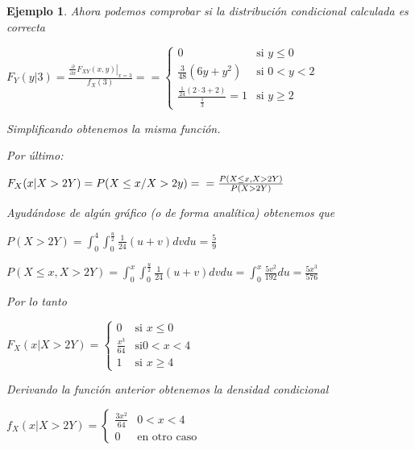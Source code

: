 \documentclass[12pt]{report}
\newtheorem{example}[definition]{Ejemplo}
\begin{document}
\begin{example}
Ahora podemos comprobar si la distribución  condicional calculada es correcta

$F_{Y}(y|3)=\frac{\left.\frac{\partial}{\partial x}
F_{XY}(x,y)\right|_{x=3}}{f_{X}(3)}=$\newline $=\left\{\begin{array}{ll} 0 & \mbox{si }
y\leq 0\\ \frac{3}{48}(6y +y^2) & \mbox{si } 0<y<2\\ \frac{\frac{1}{24}(2\cdot 3
+2)}{\frac{1}{3}}=1 & \mbox{si }  y\geq 2
\end{array}
\right.$

Simplificando obtenemos la misma función.

Por último:

$F_{X}(x|X>2 Y)=P(X\leq x/X>2y)=\newline =\frac{P(X\leq x,X>2Y)}{P(X>2Y)}$


Ayudándose de algún gráfico (o de forma \newline analítica) obtenemos  que

$P(X>2Y)=\int_{0}^{4}\int_{0}^{\frac{u}{2}} \frac{1}{24} (u+v) dv du=\frac{5}{9}$

$P(X\leq x , X>2Y)=\int_{0}^{x}\int_{0}^{\frac{u}{2}} \frac{1}{24}(u+v) dv du=\int_{0}^x
\frac{5 v^2}{192}du= \frac{5 x^3}{576}$

Por lo tanto

$F_{X}(x|X>2Y)=\left\{\begin{array}{ll} 0 & \mbox{si } x\leq 0\\ \frac{x^3}{64} & \mbox{si
} 0<x<4\\ 1 & \mbox{si } x\geq 4
\end{array}
\right.$

Derivando la función anterior obtenemos la densidad condicional

$f_{X}(x|X>2 Y)=\left\{\begin{array}{ll} \frac{3x^2}{64} & 0<x<4\\ 0 & \mbox{en otro caso}
\end{array}\right.$
\end{example}
\end{document}
